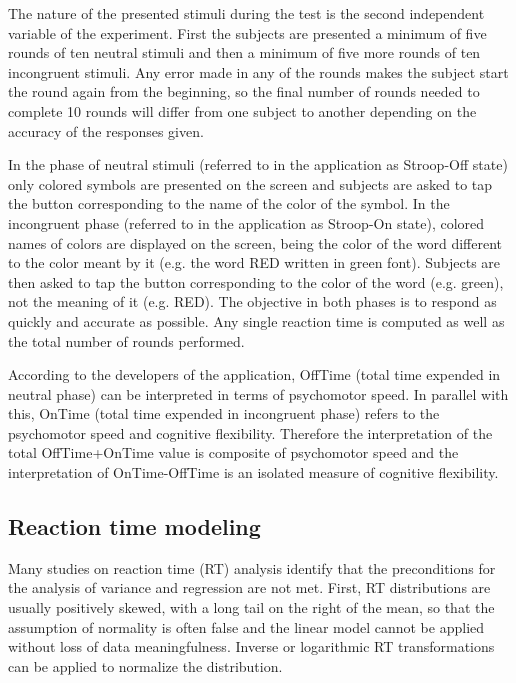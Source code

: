 \documentclass[10pt]{article}
\begin{document}
The nature of the presented stimuli during the test is the second independent variable of the experiment. First the subjects are presented a minimum of five rounds of ten neutral stimuli and then a minimum of five more rounds of ten incongruent stimuli. Any error made in any of the rounds makes the subject start the round again from the beginning, so the final number of rounds needed to complete 10 rounds will differ from one subject to another depending on the accuracy of the responses given.

In the phase of neutral stimuli (referred to in the application as Stroop-Off state) only colored symbols are presented on the screen and subjects are asked to tap the button corresponding to the name of the color of the symbol. In the incongruent phase (referred to in the application as Stroop-On state), colored names of colors are displayed on the screen, being the color of the word different to the color meant by it (e.g. the word RED written in green font). Subjects are then asked to tap the button corresponding to the color of the word (e.g. green), not the meaning of it (e.g. RED). The objective in both phases is to respond as quickly and accurate as possible. Any single reaction time is computed as well as the total number of rounds performed.

According to the developers of the application, OffTime (total time expended in neutral phase) can be interpreted in terms of psychomotor speed. In parallel with this, OnTime (total time expended in incongruent phase) refers to the psychomotor speed and cognitive flexibility. Therefore the interpretation of the total OffTime+OnTime value is composite of psychomotor speed and the interpretation of OnTime-OffTime is an isolated measure of cognitive flexibility.


\subsection*{Reaction time modeling}

Many studies on reaction time (RT) analysis identify that the preconditions for the analysis of variance and regression are not met\cite{Lachaud2011a}. First, RT distributions are usually positively skewed, with a long tail on the right of the mean, so that the assumption of normality is often false and the linear model cannot be applied without loss of data meaningfulness\cite{Whelan2010}. Inverse or logarithmic RT transformations can be applied to normalize the distribution\cite{Baayen2010}.
\end{document}
